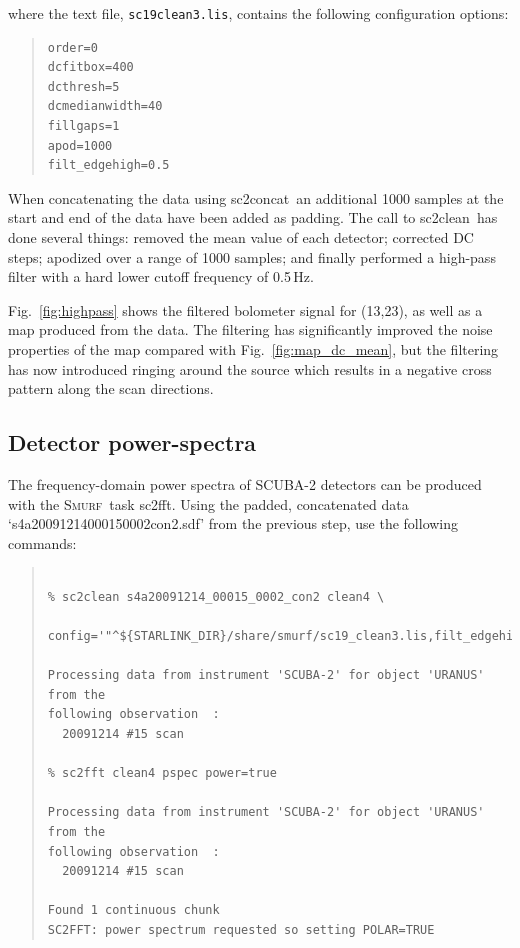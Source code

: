 \documentclass[twoside,11pt]{article}
\newcommand{\xref}[3]{#1}
\newcommand{\xlabel}[1]{}
\renewcommand{\_}{\texttt{\symbol{95}}}
\newenvironment{myquote}{\begin{quote}\begin{small}}{\end{small}\end{quote}}
\newcommand{\smurf}{\xref{\textsc{Smurf}}{sun258}{}}
\newcommand{\task}[1]{\textsf{#1}}
\newcommand{\concat}{\xref{\task{sc2concat}}{sun258}{SC2CONCAT}}
\newcommand{\fft}{\xref{\task{sc2fft}}{sun258}{SC2FFT}}
\newcommand{\clean}{\xref{\task{sc2clean}}{sun258}{SC2CLEAN}}
\begin{document}
where the text file, \texttt{sc19\_clean3.lis}, contains the following configuration options:

\begin{myquote}
\begin{verbatim}
order=0
dcfitbox=400
dcthresh=5
dcmedianwidth=40
fillgaps=1
apod=1000
filt_edgehigh=0.5
\end{verbatim}
\end{myquote}

When concatenating the data using \concat\ an additional 1000 samples
at the start and end of the data have been added as padding. The call
to \clean\ has done several things: removed the mean value of each
detector; corrected DC steps; apodized over a range of 1000 samples;
and finally performed a high-pass filter with a hard lower cutoff
frequency of 0.5\,Hz.

Fig.~\ref{fig:highpass} shows the filtered bolometer signal for
(13,23), as well as a map produced from the data. The filtering has
significantly improved the noise properties of the map compared with
Fig.~\ref{fig:map_dc_mean}, but the filtering has now introduced
ringing around the source which results in a negative cross
pattern along the scan directions.

\subsection{\xlabel{pspec}Detector power-spectra}

The frequency-domain power spectra of SCUBA-2 detectors can be
produced with the \smurf\ task \fft. Using the padded, concatenated
data `s4a20091214\_00015\_0002\_con2.sdf' from the previous step, use the
following commands:

\begin{myquote}
\begin{verbatim}

% sc2clean s4a20091214_00015_0002_con2 clean4 \
   config='"^${STARLINK_DIR}/share/smurf/sc19_clean3.lis,filt_edgehigh=0"'

Processing data from instrument 'SCUBA-2' for object 'URANUS' from the
following observation  :
  20091214 #15 scan

% sc2fft clean4 pspec power=true

Processing data from instrument 'SCUBA-2' for object 'URANUS' from the
following observation  :
  20091214 #15 scan

Found 1 continuous chunk
SC2FFT: power spectrum requested so setting POLAR=TRUE

\end{verbatim}
\end{myquote}
\end{document}
